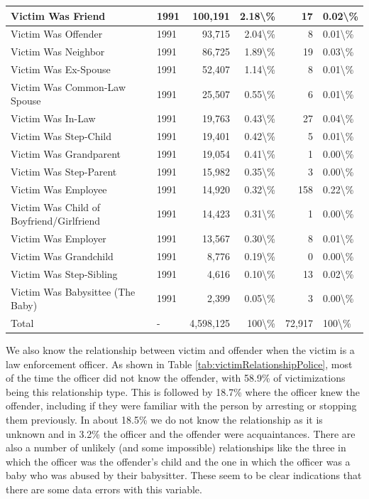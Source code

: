 \documentclass[
]{krantz}
\begin{document}
\begin{longtable}[t]{l|l|r|r|r|l}
\hline
Victim Was Friend & 1991 & 100,191 & 2.18\textbackslash{}\% & 17 & 0.02\textbackslash{}\%\\
\hline
Victim Was Offender & 1991 & 93,715 & 2.04\textbackslash{}\% & 8 & 0.01\textbackslash{}\%\\
\hline
Victim Was Neighbor & 1991 & 86,725 & 1.89\textbackslash{}\% & 19 & 0.03\textbackslash{}\%\\
\hline
Victim Was Ex-Spouse & 1991 & 52,407 & 1.14\textbackslash{}\% & 8 & 0.01\textbackslash{}\%\\
\hline
Victim Was Common-Law Spouse & 1991 & 25,507 & 0.55\textbackslash{}\% & 6 & 0.01\textbackslash{}\%\\
\hline
Victim Was In-Law & 1991 & 19,763 & 0.43\textbackslash{}\% & 27 & 0.04\textbackslash{}\%\\
\hline
Victim Was Step-Child & 1991 & 19,401 & 0.42\textbackslash{}\% & 5 & 0.01\textbackslash{}\%\\
\hline
Victim Was Grandparent & 1991 & 19,054 & 0.41\textbackslash{}\% & 1 & 0.00\textbackslash{}\%\\
\hline
Victim Was Step-Parent & 1991 & 15,982 & 0.35\textbackslash{}\% & 3 & 0.00\textbackslash{}\%\\
\hline
Victim Was Employee & 1991 & 14,920 & 0.32\textbackslash{}\% & 158 & 0.22\textbackslash{}\%\\
\hline
Victim Was Child of Boyfriend/Girlfriend & 1991 & 14,423 & 0.31\textbackslash{}\% & 1 & 0.00\textbackslash{}\%\\
\hline
Victim Was Employer & 1991 & 13,567 & 0.30\textbackslash{}\% & 8 & 0.01\textbackslash{}\%\\
\hline
Victim Was Grandchild & 1991 & 8,776 & 0.19\textbackslash{}\% & 0 & 0.00\textbackslash{}\%\\
\hline
Victim Was Step-Sibling & 1991 & 4,616 & 0.10\textbackslash{}\% & 13 & 0.02\textbackslash{}\%\\
\hline
Victim Was Babysittee (The Baby) & 1991 & 2,399 & 0.05\textbackslash{}\% & 3 & 0.00\textbackslash{}\%\\
\hline
Total & - & 4,598,125 & 100\textbackslash{}\% & 72,917 & 100\textbackslash{}\%\\
\hline
\end{longtable}

We also know the relationship between victim and offender
when the victim is a law enforcement officer. As shown in
Table \ref{tab:victimRelationshipPolice}, most of the time
the officer did not know the offender, with 58.9\% of
victimizations being this relationship type. This is
followed by 18.7\% where the officer knew the offender,
including if they were familiar with the person by arresting
or stopping them previously. In about 18.5\% we do not know
the relationship as it is unknown and in 3.2\% the officer
and the offender were acquaintances. There are also a number
of unlikely (and some impossible) relationships like the
three in which the officer was the offender's child and the
one in which the officer was a baby who was abused by their
babysitter. These seem to be clear indications that there
are some data errors with this variable.
\end{document}
